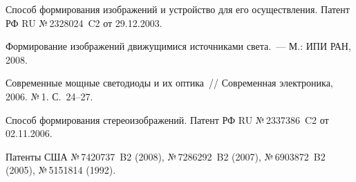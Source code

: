 \begin{multicols}{2}
     
{\small\frenchspacing
{%
\begin{thebibliography}{9}

  Способ формирования изображений и устройство для его осуществления. Патент РФ 
RU №\,2328024~C2 от 29.12.2003. 
  
  Формирование изображений движущимися источниками света.~--- М.: ИПИ РАН, 
2008. 
  
  Современные мощные светодиоды и их оптика~// Современная электроника, 2006. 
№\,1. С.~24--27.
  
  Способ формирования стереоизображений. Патент РФ RU №\,2337386~C2 от 
02.11.2006.

  \label{end\stat}
  
  Патенты США №\,7420737~B2 (2008), №\,7286292~B2 (2007), №\,6903872~B2 (2005), 
№\,5151814 (1992).
  
  
 
\end{thebibliography}
}
}
\end{multicols}  
 
 
 